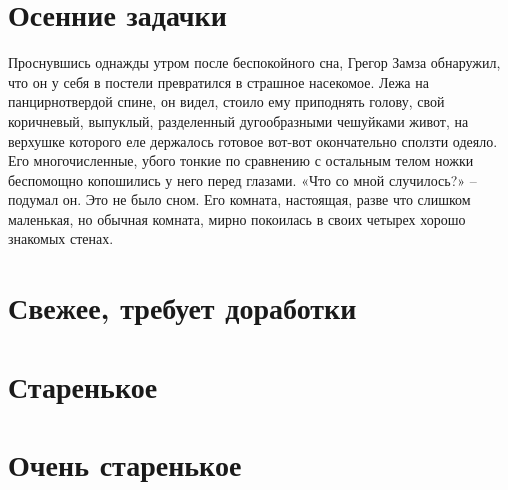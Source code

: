 \chapter{Осенние задачки}

Проснувшись однажды утром после беспокойного сна, Грегор Замза обнаружил, что
он у себя в постели превратился в страшное насекомое. Лежа на панцирнотвердой
спине, он видел, стоило ему приподнять голову, свой коричневый, выпуклый,
разделенный дугообразными чешуйками живот, на верхушке которого еле держалось
готовое вот-вот окончательно сползти одеяло. Его многочисленные, убого тонкие
по сравнению с остальным телом ножки беспомощно копошились у него перед
глазами. «Что со мной случилось?» – подумал он. Это не было сном. Его комната,
настоящая, разве что слишком маленькая, но обычная комната, мирно покоилась в
своих четырех хорошо знакомых стенах.








\chapter{Свежее, требует доработки} %





\chapter{Старенькое} %







\chapter{Очень старенькое} %









